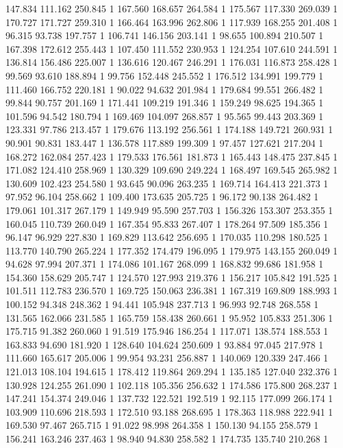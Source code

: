 	147.834	111.162	250.845	1
	167.560	168.657	264.584	1
	175.567	117.330	269.039	1
	170.727	171.727	259.310	1
	166.464	163.996	262.806	1
	117.939	168.255	201.408	1
	96.315	93.738	197.757	1
	106.741	146.156	203.141	1
	98.655	100.894	210.507	1
	167.398	172.612	255.443	1
	107.450	111.552	230.953	1
	124.254	107.610	244.591	1
	136.814	156.486	225.007	1
	136.616	120.467	246.291	1
	176.031	116.873	258.428	1
	99.569	93.610	188.894	1
	99.756	152.448	245.552	1
	176.512	134.991	199.779	1
	111.460	166.752	220.181	1
	90.022	94.632	201.984	1
	179.684	99.551	266.482	1
	99.844	90.757	201.169	1
	171.441	109.219	191.346	1
	159.249	98.625	194.365	1
	101.596	94.542	180.794	1
	169.469	104.097	268.857	1
	95.565	99.443	203.369	1
	123.331	97.786	213.457	1
	179.676	113.192	256.561	1
	174.188	149.721	260.931	1
	90.901	90.831	183.447	1
	136.578	117.889	199.309	1
	97.457	127.621	217.204	1
	168.272	162.084	257.423	1
	179.533	176.561	181.873	1
	165.443	148.475	237.845	1
	171.082	124.410	258.969	1
	130.329	109.690	249.224	1
	168.497	169.545	265.982	1
	130.609	102.423	254.580	1
	93.645	90.096	263.235	1
	169.714	164.413	221.373	1
	97.952	96.104	258.662	1
	109.400	173.635	205.725	1
	96.172	90.138	264.482	1
	179.061	101.317	267.179	1
	149.949	95.590	257.703	1
	156.326	153.307	253.355	1
	160.045	110.739	260.049	1
	167.354	95.833	267.407	1
	178.264	97.509	185.356	1
	96.147	96.929	227.830	1
	169.829	113.642	256.695	1
	170.035	110.298	180.525	1
	113.770	140.790	265.224	1
	177.352	174.479	196.095	1
	179.975	143.155	260.049	1
	94.628	97.994	207.371	1
	174.086	101.167	268.099	1
	168.832	99.686	181.958	1
	154.360	158.629	205.747	1
	124.570	127.993	219.376	1
	156.217	105.842	191.525	1
	101.511	112.783	236.570	1
	169.725	150.063	236.381	1
	167.319	169.809	188.993	1
	100.152	94.348	248.362	1
	94.441	105.948	237.713	1
	96.993	92.748	268.558	1
	131.565	162.066	231.585	1
	165.759	158.438	260.661	1
	95.952	105.833	251.306	1
	175.715	91.382	260.060	1
	91.519	175.946	186.254	1
	117.071	138.574	188.553	1
	163.833	94.690	181.920	1
	128.640	104.624	250.609	1
	93.884	97.045	217.978	1
	111.660	165.617	205.006	1
	99.954	93.231	256.887	1
	140.069	120.339	247.466	1
	121.013	108.104	194.615	1
	178.412	119.864	269.294	1
	135.185	127.040	232.376	1
	130.928	124.255	261.090	1
	102.118	105.356	256.632	1
	174.586	175.800	268.237	1
	147.241	154.374	249.046	1
	137.732	122.521	192.519	1
	92.115	177.099	266.174	1
	103.909	110.696	218.593	1
	172.510	93.188	268.695	1
	178.363	118.988	222.941	1
	169.530	97.467	265.715	1
	91.022	98.998	264.358	1
	150.130	94.155	258.579	1
	156.241	163.246	237.463	1
	98.940	94.830	258.582	1
	174.735	135.740	210.268	1
